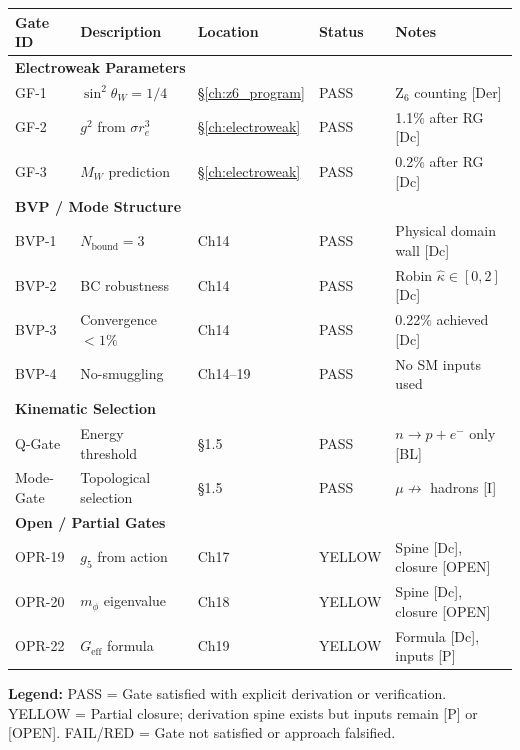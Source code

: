 \begin{center}
\small
\begin{tabular}{@{}llllp{4cm}@{}}
\toprule
\textbf{Gate ID} & \textbf{Description} & \textbf{Location} & \textbf{Status} & \textbf{Notes} \\
\midrule
\multicolumn{5}{l}{\textbf{Electroweak Parameters}} \\
\midrule
GF-1 & $\sin^2\theta_W = 1/4$ & \S\ref{ch:z6_program} & \textcolor{OliveGreen}{PASS} & Z$_6$ counting [Der] \\
GF-2 & $g^2$ from $\sigma r_e^3$ & \S\ref{ch:electroweak} & \textcolor{OliveGreen}{PASS} & 1.1\% after RG [Dc] \\
GF-3 & $M_W$ prediction & \S\ref{ch:electroweak} & \textcolor{OliveGreen}{PASS} & 0.2\% after RG [Dc] \\
\midrule
\multicolumn{5}{l}{\textbf{BVP / Mode Structure}} \\
\midrule
BVP-1 & $N_{\text{bound}} = 3$ & Ch14 & \textcolor{OliveGreen}{PASS} & Physical domain wall [Dc] \\
BVP-2 & BC robustness & Ch14 & \textcolor{OliveGreen}{PASS} & Robin $\hat\kappa \in [0,2]$ [Dc] \\
BVP-3 & Convergence $<1\%$ & Ch14 & \textcolor{OliveGreen}{PASS} & 0.22\% achieved [Dc] \\
BVP-4 & No-smuggling & Ch14--19 & \textcolor{OliveGreen}{PASS} & No SM inputs used \\
\midrule
\multicolumn{5}{l}{\textbf{Kinematic Selection}} \\
\midrule
Q-Gate & Energy threshold & \S1.5 & \textcolor{OliveGreen}{PASS} & $n \to p + e^-$ only [BL] \\
Mode-Gate & Topological selection & \S1.5 & \textcolor{OliveGreen}{PASS} & $\mu \not\to$ hadrons [I] \\
\midrule
\multicolumn{5}{l}{\textbf{Open / Partial Gates}} \\
\midrule
OPR-19 & $g_5$ from action & Ch17 & \textcolor{YellowOrange}{YELLOW} & Spine [Dc], closure [OPEN] \\
OPR-20 & $m_\phi$ eigenvalue & Ch18 & \textcolor{YellowOrange}{YELLOW} & Spine [Dc], closure [OPEN] \\
OPR-22 & $G_{\text{eff}}$ formula & Ch19 & \textcolor{YellowOrange}{YELLOW} & Formula [Dc], inputs [P] \\
\bottomrule
\end{tabular}
\end{center}

\textbf{Legend:}
\textcolor{OliveGreen}{PASS} = Gate satisfied with explicit derivation or verification.
\textcolor{YellowOrange}{YELLOW} = Partial closure; derivation spine exists but inputs remain [P] or [OPEN].
\textcolor{BrickRed}{FAIL/RED} = Gate not satisfied or approach falsified.


